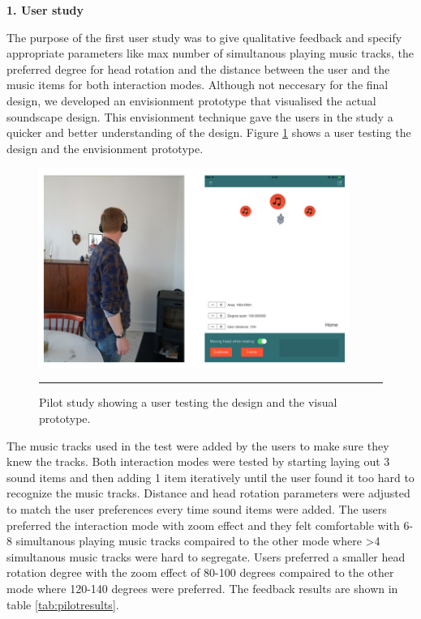 \textbf{1. User study}

The purpose of the first user study was to give qualitative feedback and specify appropriate parameters like max number of simultanous playing music tracks, the preferred degree for head rotation and the distance between the user and the music items for both interaction modes. Although not neccesary for the final design, we developed an envisionment prototype \cite{benyon_designing_2010} that visualised the actual soundscape design. This envisionment technique gave the users in the study a quicker and better understanding of the design. Figure \ref{fig:pilotstudy} shows a user testing the design and the envisionment prototype.

\begin{figure}[b]
	\centering
		\includegraphics[width=0.9\textwidth,height=\textheight,keepaspectratio]{./Figures/pilotstudy.jpg}
		\rule{35em}{0.5pt}
	\caption[Pilot study]{Pilot study showing a user testing the design and the visual prototype.}
	\label{fig:pilotstudy}
\end{figure}

The music tracks used in the test were added by the users to make sure they knew the tracks. Both interaction modes were tested by starting laying out 3 sound items and then adding 1 item iteratively until the user found it too hard to recognize the music tracks. Distance and head rotation parameters were adjusted to match the user preferences every time sound items were added. The users preferred the interaction mode with zoom effect and they felt comfortable with 6-8 simultanous playing music tracks compaired to the other mode where \textgreater 4 simultanous music tracks were hard to segregate. Users preferred a smaller head rotation degree with the zoom effect of 80-100 degrees compaired to the other mode where 120-140 degrees were preferred. The feedback results are shown in table \ref{tab:pilotresults}.

